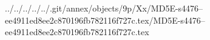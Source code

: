 ../../../../../.git/annex/objects/9p/Xx/MD5E-s4476--ee4911ed8ee2c870196fb782116f727c.tex/MD5E-s4476--ee4911ed8ee2c870196fb782116f727c.tex